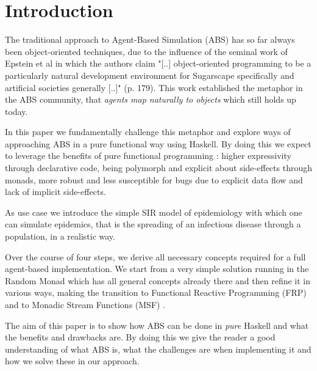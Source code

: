 \section{Introduction}
The traditional approach to Agent-Based Simulation (ABS) has so far always been object-oriented techniques, due to the influence of the seminal work of Epstein et al \cite{epstein_growing_1996} in which the authors claim "[..] object-oriented programming to be a particularly natural development environment for Sugarscape specifically and artificial societies generally [..]" (p. 179). This work established the metaphor in the ABS community, that \textit{agents map naturally to objects} \cite{north_managing_2007} which still holds up today.

In this paper we fundamentally challenge this metaphor and explore ways of approaching ABS in a pure functional way using Haskell. By doing this we expect to leverage the benefits of pure functional programming \cite{hudak_history_2007}: higher expressivity through declarative code, being polymorph and explicit about side-effects through monads, more robust and less susceptible for bugs due to explicit data flow and lack of implicit side-effects.

As use case we introduce the simple SIR model of epidemiology with which one can simulate epidemics, that is the spreading of an infectious disease through a population, in a realistic way.

Over the course of four steps, we derive all necessary concepts required for a full agent-based implementation. We start from a very simple solution running in the Random Monad which has all general concepts already there and then refine it in various ways, making the transition to Functional Reactive Programming (FRP) \cite{wan_functional_2000} and to Monadic Stream Functions (MSF) \cite{perez_functional_2016}.

The aim of this paper is to show how ABS can be done in \textit{pure} Haskell and what the benefits and drawbacks are. By doing this we give the reader a good understanding of what ABS is, what the challenges are when implementing it and how we solve these in our approach.

